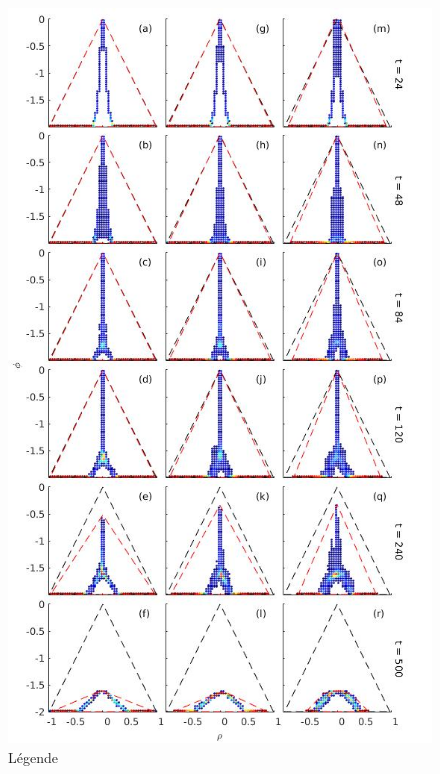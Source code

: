 \documentclass[a4paper,12pt]{article}
\begin{document}
    \begin{figure}[!h]
        \centering
        \label{scatterplot_rho}
        \includegraphics[width=0.6\linewidth]{figures/scatterplot_rhodiff.jpg}
        \caption{Légende}
    \end{figure}
    
\end{document}
